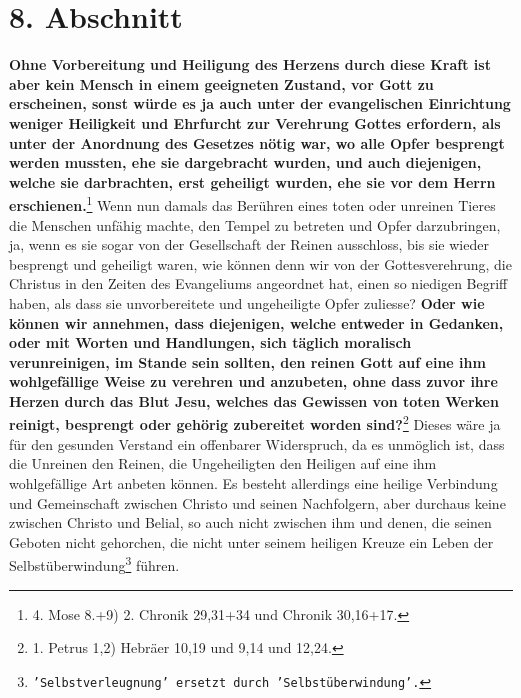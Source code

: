 \section{8. Abschnitt} \label{kap6_ab8}

\textbf{Ohne Vorbereitung und Heiligung des Herzens
durch diese Kraft ist aber kein
Mensch in einem geeigneten Zustand, vor Gott zu erscheinen, sonst würde es ja
auch unter der evangelischen Einrichtung weniger Heiligkeit und Ehrfurcht zur
Verehrung Gottes erfordern, als unter der Anordnung des Gesetzes nötig war, wo
alle Opfer besprengt werden mussten, ehe sie dargebracht wurden, und auch
diejenigen, welche sie darbrachten, erst geheiligt wurden, ehe sie vor dem
Herrn erschienen.}\footnote{4. Mose 8.+9) 2. Chronik 29,31+34 und Chronik
30,16+17.}
Wenn nun damals das Berühren eines toten oder unreinen Tieres die Menschen
unfähig machte, den Tempel zu betreten und Opfer darzubringen, ja, wenn es sie
sogar von der Gesellschaft der Reinen ausschloss, bis sie wieder besprengt und
geheiligt waren, wie können denn wir von der Gottesverehrung, die Christus in
den Zeiten des Evangeliums angeordnet hat, einen so niedigen Begriff haben, als
dass sie unvorbereitete und ungeheiligte Opfer zuliesse?
\label{ref:06_08_moralisch_verunreinigt} \textbf{Oder wie können wir
annehmen, dass diejenigen, welche entweder in Gedanken, oder mit Worten und
Handlungen, sich täglich moralisch verunreinigen, im Stande sein sollten, den
reinen Gott auf eine ihm wohlgefällige Weise zu verehren und anzubeten, ohne
dass zuvor ihre Herzen durch das Blut Jesu, welches das Gewissen von toten
Werken reinigt, besprengt oder gehörig zubereitet worden
sind?}\footnote{1. Petrus 1,2) Hebräer 10,19 und 9,14 und 12,24.}
Dieses wäre ja für den gesunden Verstand ein
offenbarer Widerspruch, da es unmöglich ist, dass die Unreinen den Reinen, die
Ungeheiligten den Heiligen auf eine ihm
wohlgefällige Art anbeten können. Es
besteht allerdings eine heilige Verbindung und Gemeinschaft
zwischen Christo
und seinen Nachfolgern, aber durchaus keine
zwischen
Christo
und Belial, so
auch nicht zwischen ihm und denen, die seinen Geboten nicht gehorchen, die nicht
unter seinem heiligen Kreuze ein Leben der
Selbstüberwindung\footnote{\texttt{'Selbstverleugnung' ersetzt durch
'Selbstüberwindung'.}} führen.

